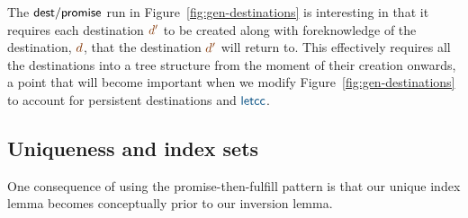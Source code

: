 The ${\sf dest/promise}$ run in Figure~\ref{fig:gen-destinations} is
interesting in that it requires each destination $\lf{d'}$ to be
created along with foreknowledge of the destination, $\lf{d}$, that
the destination $\lf{d'}$ will return to. This effectively requires
all the destinations into a tree structure from the moment of their
creation onwards, a point that will become important when we modify
Figure~\ref{fig:gen-destinations} to account for persistent
destinations and $\obj{\sf letcc}$.

\subsection{Uniqueness and index sets}

One consequence of using the promise-then-fulfill pattern is that our
unique index lemma becomes conceptually prior to our inversion lemma.

